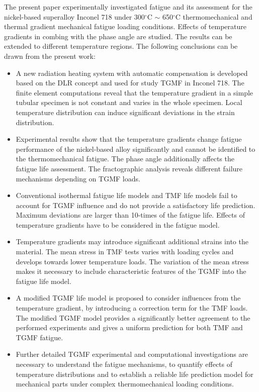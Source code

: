\documentclass[preprint,5p,twocolumn,10pt,sort&compress]{elsarticle}
\begin{document}
The present paper experimentally investigated fatigue and its assessment for the nickel-based superalloy Inconel 718 under 300$^\circ$C $\sim$ 650$^\circ$C thermomechanical and thermal gradient mechanical fatigue loading conditions. Effects of temperature gradients in combing with the phase angle are studied. The results can be extended to different temperature regions. The following conclusions can be drawn from the present work:
\begin{itemize}
\item A new radiation heating system with automatic compensation is developed based on the DLR concept and used for study TGMF in Inconel 718. The finite element computations reveal that the temperature gradient in a simple tubular specimen is not constant and varies in the whole specimen.  Local temperature distribution can induce significant deviations in the strain distribution.

\item Experimental results show that the temperature gradients change {fatigue performance} of the nickel-based alloy significantly and cannot be identified to the thermomechanical fatigue. The phase angle additionally affects the fatigue life assessment. The fractographic analysis reveals different failure mechanisms depending on TGMF loads.

\item Conventional isothermal fatigue life models and TMF life models fail to account for TGMF influence and do not provide a satisfactory life prediction.  Maximum deviations are larger than 10-times of the fatigue life. Effects of temperature gradients have to be considered in the fatigue model.

\item Temperature gradients may introduce significant additional strains into the material. The mean stress in TMF tests varies with loading cycles and develops towards lower temperature loads. The variation of the mean stress makes it necessary to include characteristic features of the TGMF into the fatigue life model.

\item A modified TGMF life model is proposed to consider influences from the temperature gradient, by introducing a correction term for the TMF loads. The modified TGMF model provides a significantly better agreement to the performed experiments and gives a uniform prediction for both TMF and TGMF fatigue.

\item Further detailed TGMF experimental and computational investigations are necessary to understand the fatigue mechanisms, to quantify effects of temperature distributions and to establish a reliable life prediction model for mechanical parts under complex thermomechanical loading conditions.

\end{itemize}
\end{document}
